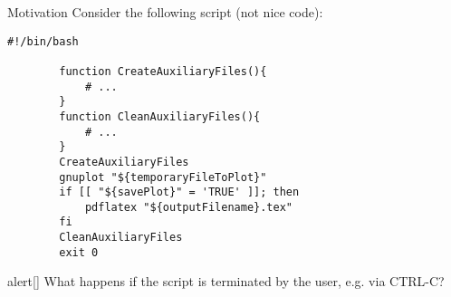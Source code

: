 
\begin{frame}[fragile]{Motivation}
    \vspace{-2mm}
    Consider the following script (\alert{not nice code}):
    \begin{lstlisting}[style=MyBash, aboveskip=3mm, belowskip=-5mm]
        #!/bin/bash
        
        function CreateAuxiliaryFiles(){
            # ...
        }
        function CleanAuxiliaryFiles(){
            # ...
        }
        CreateAuxiliaryFiles
        gnuplot "${temporaryFileToPlot}"
        if [[ "${savePlot}" = 'TRUE' ]]; then
            pdflatex "${outputFilename}.tex"
        fi
        CleanAuxiliaryFiles
        exit 0
    \end{lstlisting}
    \begin{varblock}{alert}[\textwidth]{}
        \Large \alert{What happens if the script is terminated by the user, e.g. via CTRL-C?}
    \end{varblock}
\end{frame}
